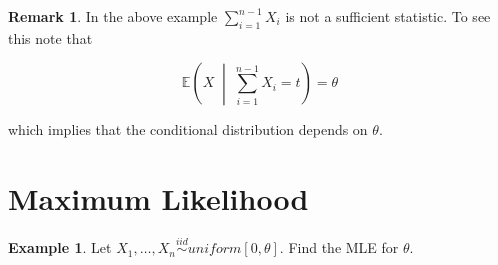 \documentclass[12pt]{article}
\theoremstyle{definition}
\newtheorem*{example}{Example}
\newtheorem*{remark}{Remark}
\begin{document}
\begin{remark}
In the above example $\sum_{i = 1}^{n-1} X_i$ is not a sufficient statistic. To
see this note that

$$ \mathbb{E}\left(X \; \middle|\;  \sum_{i =1}^{n-1} X_i = t \right) = \theta$$

which implies that the conditional distribution depends on $\theta$.
\end{remark}

\section{Maximum Likelihood}

\begin{example}
Let $X_1, \ldots, X_n \overset{iid}{\sim} uniform[0,\theta]$. Find the MLE for $\theta$.
\end{example}
\end{document}
